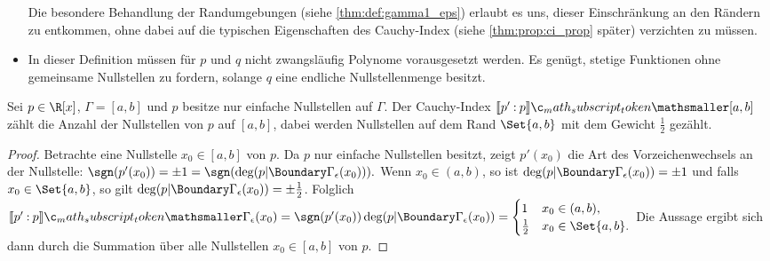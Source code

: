 \documentclass{mythesis}
\begin{document}
\begin{definition}
\begin{note}
\begin{itemize}
                Die besondere Behandlung der Randumgebungen (siehe \ref{thm:def:gamma1_eps}) erlaubt es uns, dieser Einschränkung an den Rändern zu entkommen, ohne dabei auf die typischen Eigenschaften des Cauchy-Index (siehe \ref{thm:prop:ci_prop} später) verzichten zu müssen.
            \item
                In dieser Definition müssen für $p$ und $q$ nicht zwangsläufig Polynome vorausgesetzt werden.
                Es genügt, stetige Funktionen ohne gemeinsame Nullstellen zu fordern, solange $q$ eine endliche Nullstellenmenge besitzt.
        \end{itemize}
    \end{note}
\end{definition}


\begin{example} \label{thm:ex:ci_roots}
    Sei $p \in \R[x]$, $\Gamma = [a,b]$ und $p$ besitze nur einfache Nullstellen auf $\Gamma$.
    Der Cauchy-Index $\Index{[a,b]}{p'}{p}$ zählt die Anzahl der Nullstellen von $p$ auf $[a,b]$, dabei werden Nullstellen auf dem Rand $\Set{a,b}$ mit dem Gewicht $\frac{1}{2}$ gezählt.
    \begin{proof}
        Betrachte eine Nullstelle $x_0 \in [a,b]$ von $p$.
        Da $p$ nur einfache Nullstellen besitzt, zeigt $p'(x_0)$ die Art des Vorzeichenwechsels an der Nullstelle:
        \begin{math}
            \sgn(p'(x_0)) = \pm 1 = \sgn(\deg(p|\Boundary\Gamma_\epsilon(x_0))).
        \end{math}
        Wenn $x_0 \in (a,b)$, so ist $\deg(p|\Boundary\Gamma_\epsilon(x_0)) = \pm 1$ und falls $x_0 \in \Set{a,b}$, so gilt $\deg(p|\Boundary\Gamma_\epsilon(x_0)) = \pm \frac{1}{2}$.
        Folglich
        \begin{math}
            \Index{\Gamma_\epsilon(x_0)}{p'}{p}
            = \sgn(p'(x_0)) \deg(p|\Boundary\Gamma_\epsilon(x_0)) = \begin{cases}
                1 & x_0 \in (a,b), \\
                \frac{1}{2} & x_0 \in \Set{a,b}.
            \end{cases}
        \end{math}
        Die Aussage ergibt sich dann durch die Summation über alle Nullstellen $x_0 \in [a,b]$ von $p$.
    \end{proof}
\end{example}
\end{document}
